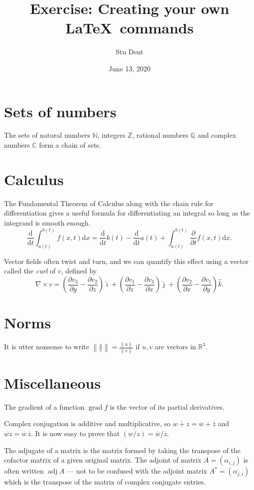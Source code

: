 \documentclass[a4paper,11pt]{article}
\title{Exercise: Creating your own \LaTeX \, commands}
\author{Stu Dent}
\date{June 13, 2020}
\newcommand{\N}{\mathbb{N}}
\newcommand{\Z}{\mathbb{Z}}
\newcommand{\Q}{\mathbb{Q}}
\newcommand{\R}{\mathbb{R}}
\newcommand{\C}{\mathbb{C}}
\newcommand{\del}{\partial}
\newcommand{\dee}{\mathrm{d}}
\newcommand{\conj}[1]{\overline{#1}}
\newcommand{\norm}[1]{\left\| #1 \right\|}
\newcommand{\curl}{\nabla \times}
\DeclareMathOperator{\grad}{grad}
\DeclareMathOperator{\adj}{adj}
\begin{document}
\maketitle

\section{Sets of numbers}

The sets of natural numbers $\N$, integers $\Z$, rational numbers $\Q$ and complex numbers $\C$ form a chain of sets.

\section{Calculus}
The Fundamental Theorem of Calculus along with the chain rule for differentiation gives a useful formula for differentiating an integral so long as the integrand is smooth enough.
\[
\frac{\dee}{\dee t} \int_{a(t)}^{b(t)} f(x,t) \dee x = \frac{\dee}{\dee t} b(t) - \frac{\dee}{\dee t}a(t) + \int_{a(t)}^{b(t)} \frac{\del}{\del t} f(x,t) \dee x.
\]

Vector fields often twist and turn, and we can quantify this effect using a vector called the \emph{curl} of $v$, defined by
\[
\curl v = \left(
	\frac{\del v_3}{\del y} - \frac{\del v_2}{\del z}
\right) \hat{\imath}
+ \left(
	\frac{\del v_1}{\del z} - \frac{\del v_3}{\del x}
\right) \hat{\jmath}
+ \left(
	\frac{\del v_2}{\del x} - \frac{\del v_1}{\del y}
\right )\hat{k}.
\]

\section{Norms}
It is utter nonsense to write $\norm{\frac{u}{v}} = \frac{\norm{u}}{\norm{v}}$ if $u,v$ are vectors in $\R^3$.

\section{Miscellaneous}
The gradient of a function $\grad f$ is the vector of its partial derivatives.

Complex conjugation is additive and multiplicative, so $\conj{w+z} = \conj{w} + \conj{z}$ and $\conj{wz} = \conj{w} \, \conj{z}$.
It is now easy to prove that $\conj{(w/z)} = \conj{w} / \conj{z}$.

The adjugate of a matrix is the matrix formed by taking the transpose of the cofactor matrix of a given original matrix. The adjoint of matrix $A = (\alpha_{i,j})$ is often written $\adj A$ --- not to be confused  with the adjoint matrix $A^* = (\conj{\alpha_{j,i}})$ which is the transpose of the matrix of complex conjugate entries.
\end{document}
